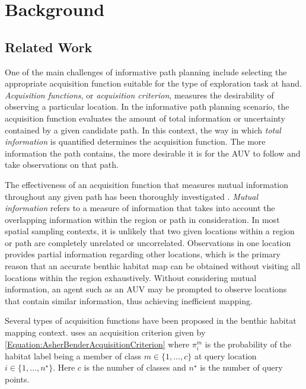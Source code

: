 \chapter{Background}
\label{Background}

	\section{Related Work}
	
		One of the main challenges of informative path planning include selecting the appropriate acquisition function suitable for the type of exploration task at hand. \textit{Acquisition functions}, or \textit{acquisition criterion}, measures the desirability of observing a particular location. In the informative path planning scenario, the acquisition function evaluates the amount of total information or uncertainty contained by a given candidate path. In this context, the way in which \textit{total information} is quantified determines the acquisition function. The more information the path contains, the more desirable it is for the AUV to follow and take observations on that path. 
		
		The effectiveness of an acquisition function that measures mutual information throughout any given path has been thoroughly investigated \citep{AsherBender, Rigby:ROB20372, Krause:2008:NSP:1390681.1390689, Kapoor}. \textit{Mutual information} refers to a measure of information that takes into account the overlapping information within the region or path in consideration. In most spatial sampling contexts, it is unlikely that two given locations within a region or path are completely unrelated or uncorrelated. Observations in one location provides partial information regarding other locations, which is the primary reason that an accurate benthic habitat map can be obtained without visiting all locations within the region exhaustively. Without considering mutual information, an agent such as an AUV may be prompted to observe locations that contain similar information, thus achieving inefficient mapping.
		
		Several types of acquisition functions have been proposed in the benthic habitat mapping context. \cite{AsherBender} uses an acquisition criterion given by \eqref{Equation:AsherBenderAcquisitionCriterion} where $\pi^{m}_{i}$ is the probability of the habitat label being a member of class $m \in \{1, \dots, c\}$ at query location $i \in \{1, \dots, n^{\star}\}$. Here $c$ is the number of classes and $n^{\star}$ is the number of query points.
		
